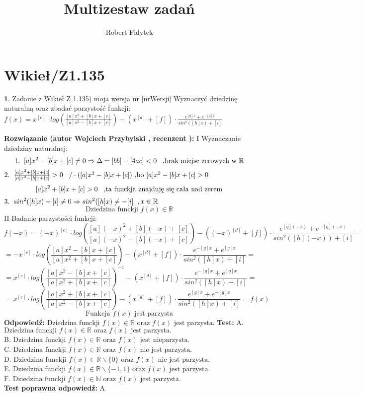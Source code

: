 \documentclass[12pt, a4paper]{article}
\title{Multizestaw zadań}
\author{Robert Fidytek}
\date{}
\theoremstyle{definition} %
\newtheorem{zad}{}
\newcommand{\kategoria}[1]{\section{#1}} %
\newcommand{\zadStart}[1]{\begin{zad}#1\newline} %
\newcommand{\zadStop}{\end{zad}}   %
\newcommand{\rozwStart}[2]{\noindent \textbf{Rozwiązanie (autor #1 , recenzent #2): }\newline} %
\newcommand{\rozwStop}{\newline}                                            %
\newcommand{\odpStart}{\noindent \textbf{Odpowiedź:}\newline}    %
\newcommand{\odpStop}{\newline}                                             %
\newcommand{\testStart}{\noindent \textbf{Test:}\newline} %
\newcommand{\testStop}{\newline} %
\newcommand{\kluczStart}{\noindent \textbf{Test poprawna odpowiedź:}\newline} %
\newcommand{\kluczStop}{\newline} %
\begin{document}
\maketitle


\kategoria{Wikieł/Z1.135}
\zadStart{Zadanie z Wikieł Z 1.135) moja wersja nr [nrWersji]}
Wyznaczyć dziedzinę naturalną oraz zbadać parzystość funkcji:\\
$f(x)=x^{[e]}\cdot log(\frac{[a]x^{2}+[b]x+[c]}{[a]x^{2}-[b]x+[c]})-(x^{[d]}+[f])\cdot\frac{e^{[g]x}+e^{-[g]x}}{sin^{2}([h]x)+[i]}$
\zadStop
\rozwStart{Wojciech Przybylski}{}
I Wyznaczanie dziedziny naturalnej:
$$1.\hspace{2mm} [a]x^{2}-[b]x+[c]\neq0 \Rightarrow \Delta=[bb]-[4ac]<0\hspace{3mm}\mbox{,brak miejsc zerowych w }\mathbb{R}$$
$2.\hspace{2mm}  \frac{[a]x^{2}+[b]x+[c]}{[a]x^{2}-[b]x+[c]}>0\hspace{3mm}/\cdot([a]x^{2}-[b]x+[c])\mbox{ ,bo }[a]x^{2}-[b]x+[c]>0 $
$$[a]x^{2}+[b]x+[c]>0 \hspace{3mm}\mbox{,ta funckja znajduję się cała nad zerem}$$
$3.\hspace{2mm}  sin^{2}([h]x)+[i]\neq0 \Rightarrow sin^{2}([h]x)\neq-[i]\hspace{2mm},x\in\mathbb{R} $
$$\mbox{Dziedzina funckji }f(x)\in \mathbb{R}$$
II Badanie parzystości funkcji:
$$f(-x)=(-x)^{[e]}\cdot log(\frac{[a](-x)^{2}+[b](-x)+[c]}{[a](-x)^{2}-[b](-x)+[c]})-((-x)^{[d]}+[f])\cdot\frac{e^{[g](-x)}+e^{-[g](-x)}}{sin^{2}([h](-x))+[i]}=$$
$$=-x^{[e]}\cdot log(\frac{[a]x^{2}-[b]x+[c]}{[a]x^{2}+[b]x+[c]})-(x^{[d]}+[f])\cdot\frac{e^{-[g]x}+e^{[g]x}}{sin^{2}([h]x)+[i]}=$$
$$=x^{[e]}\cdot log(\frac{[a]x^{2}-[b]x+[c]}{[a]x^{2}+[b]x+[c]})^{-1}-(x^{[d]}+[f])\cdot\frac{e^{-[g]x}+e^{[g]x}}{sin^{2}([h]x)+[i]}=$$
$$=x^{[e]}\cdot log(\frac{[a]x^{2}+[b]x+[c]}{[a]x^{2}-[b]x+[c]})-(x^{[d]}+[f])\cdot\frac{e^{[g]x}+e^{-[g]x}}{sin^{2}([h]x)+[i]}=f(x)$$
$$\mbox{Funkcja }f(x)\mbox{ jest parzysta}$$
\rozwStop
\odpStart
$\mbox{Dziedzina funckji }f(x)\in \mathbb{R} \mbox{ oraz } f(x)\mbox{ jest parzysta.}$ 
\odpStop
\testStart
A. $\mbox{Dziedzina funckji }f(x)\in \mathbb{R} \mbox{ oraz } f(x)\mbox{ jest parzysta.}$ \\
B. $\mbox{Dziedzina funckji }f(x)\in \mathbb{R} \mbox{ oraz } f(x)\mbox{ jest nieparzysta.}$ \\
C. $\mbox{Dziedzina funckji }f(x)\in \mathbb{R} \mbox{ oraz } f(x)\mbox{ nie jest parzysta.}$ \\
D. $\mbox{Dziedzina funckji }f(x)\in \mathbb{R}\backslash\{0\} \mbox{ oraz } f(x)\mbox{ nie jest parzysta.}$ \\
E. $\mbox{Dziedzina funckji }f(x)\in \mathbb{R}{\backslash}\{-1,1\} \mbox{ oraz } f(x)\mbox{ jest parzysta.}$ \\
F. $\mbox{Dziedzina funckji }f(x)\in \mathbb{N} \mbox{ oraz } f(x)\mbox{ jest parzysta.}$ \\
\testStop
\kluczStart
A
\kluczStop
\end{document}
